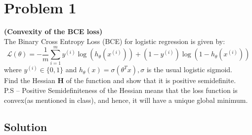 \section*{Problem 1}

\textbf{(Convexity of the BCE loss)}\\
The Binary Cross Entropy Loss (BCE) for logistic regression is given by:
\[
    \mathcal{L}(\theta)=-\frac{1}{m} \sum_{i=1}^{m} y^{(i)} \log \left(h_{\theta}\left(x^{(i)}\right)\right)+\left(1-y^{(i)}\right) \log \left(1-h_{\theta}\left(x^{(i)}\right)\right)
\]
where \( y^{(i)} \in \{0,1\} \) and \( h_{\theta}(x)=\sigma\left(\theta^{T} x\right), \sigma \) is the usual logistic sigmoid.\\
Find the Hessian \( \mathbf{H} \) of the function and show that it is positive semidefinite.\\
P.S -- Positive Semidefiniteness of the Hessian means that the loss function is convex(as mentioned in class), and hence, it will have a unique global minimum.

\subsection*{Solution}

